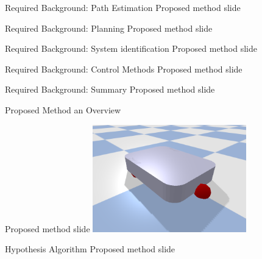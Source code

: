 
\begin{frame}[fragile]{Required Background: Path Estimation} %
  Proposed method slide
\end{frame}

\begin{frame}[fragile]{Required Background: Planning} %
  Proposed method slide
\end{frame}

\begin{frame}[fragile]{Required Background: System identification} %
  Proposed method slide
\end{frame}

\begin{frame}[fragile]{Required Background: Control Methods} %
  Proposed method slide
\end{frame}

\begin{frame}[fragile]{Required Background: Summary} %
  Proposed method slide
\end{frame}

\begin{frame}[fragile]{Proposed Method an Overview} %

  Proposed method slide
  \includegraphics[width=0.5\textwidth]{figures/boxer_robot}
\end{frame}

\begin{frame}[fragile]{Hypothesis Algorithm} %
  Proposed method slide
\end{frame}
